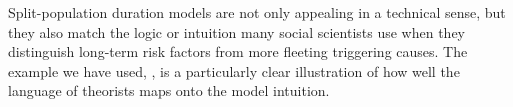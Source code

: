 \documentclass[article]{jss}
\begin{document}
Split-population duration models are not only appealing in a technical
sense, but they also match the logic or intuition many social scientists
use when they distinguish long-term risk factors from more fleeting
triggering causes. The example we have used, \citet{belkin2003toward},
is a particularly clear illustration of how well the language of
theorists maps onto the model intuition.


\end{document}
